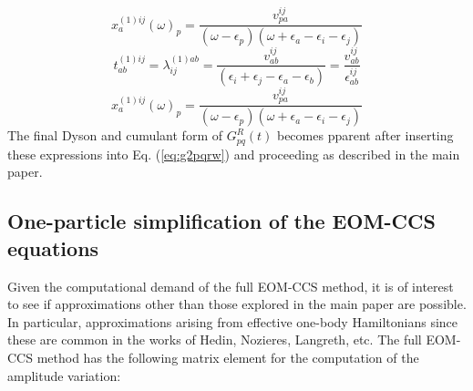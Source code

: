 \documentclass[aps,prb,preprint,groupaddress,floatfix]{revtex4}
\begin{document}
\begin{equation}
\label{eq:x1w}
x^{(1)ij}_{a}(\omega)_p = \frac{v^{ij}_{pa}}{(\omega-\epsilon_p)
(\omega+\epsilon_a-\epsilon_i-\epsilon_j)}
\end{equation}
\begin{equation}
\label{eq:tl1}
t^{(1)ij}_{ab} = \lambda^{(1)ab}_{ij} = \frac{v^{ij}_{ab}}
{(\epsilon_i+\epsilon_j-\epsilon_a-\epsilon_b)}=
\frac{v^{ij}_{ab}}{\epsilon^{ij}_{ab}}
\end{equation}
\begin{equation}
\label{eq:x2w}
x^{(1)ij}_{a}(\omega)_p = \frac{v^{ij}_{pa}}{(\omega-\epsilon_p)
(\omega+\epsilon_a-\epsilon_i-\epsilon_j)}
\end{equation}
The final Dyson and cumulant form of $G^R_{pq}(t)$ becomes pparent after inserting these expressions into Eq. (\ref{eq:g2pqrw}) and proceeding as described in the main paper. 

\subsection{One-particle simplification of the EOM-CCS equations}

Given the computational demand of the full EOM-CCS method, it is of interest to see if approximations other than those explored in the main paper are possible. In particular, approximations arising from effective one-body Hamiltonians since these are common in the works of Hedin, Nozieres, Langreth, etc. The full EOM-CCS method has the following matrix element for the computation of the amplitude variation:
\end{document}
